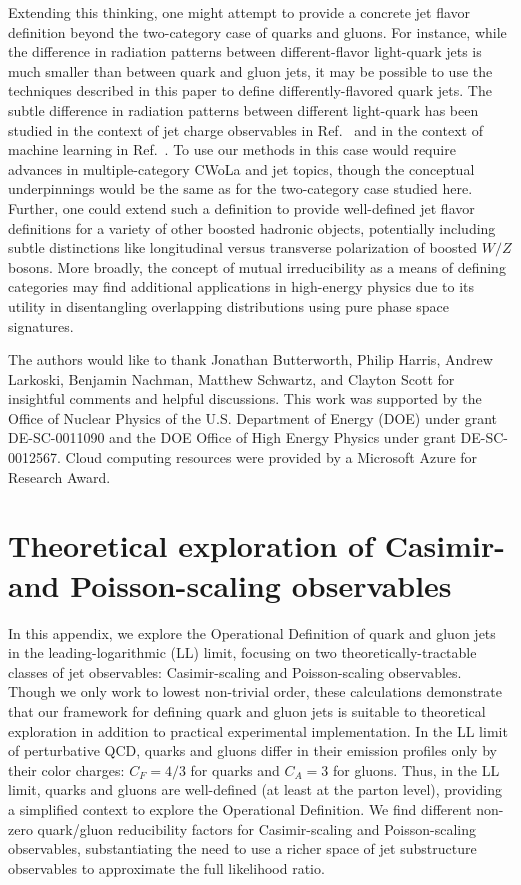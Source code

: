 \documentclass[letterpaper,11pt]{article}
\DeclareRobustCommand{\Ref}[1]{Ref.~\cite{#1}}
\begin{document}
Extending this thinking, one might attempt to provide a concrete jet flavor definition beyond the two-category case of quarks and gluons.
%
For instance, while the difference in radiation patterns between different-flavor light-quark jets is much smaller than between quark and gluon jets, it may be possible to use the techniques described in this paper to define differently-flavored quark jets.
%
The subtle difference in radiation patterns between different light-quark has been studied in the context of jet charge observables in \Ref{Krohn:2012fg} and in the context of machine learning in \Ref{Fraser:2018ieu}.
%
To use our methods in this case would require advances in multiple-category CWoLa and jet topics, though the conceptual underpinnings would be the same as for the two-category case studied here.
%
Further, one could extend such a definition to provide well-defined jet flavor definitions for a variety of other boosted hadronic objects, potentially including subtle distinctions like longitudinal versus transverse polarization of boosted $W/Z$ bosons.
%
More broadly, the concept of mutual irreducibility as a means of defining categories may find additional applications in high-energy physics due to its utility in disentangling overlapping distributions using pure phase space signatures.


\acknowledgments 
The authors would like to thank Jonathan Butterworth, Philip Harris, Andrew Larkoski, Benjamin Nachman, Matthew Schwartz, and Clayton Scott for insightful comments and helpful discussions.
%
This work was supported by the Office of Nuclear Physics of the U.S. Department of Energy (DOE) under grant DE-SC-0011090 and the DOE Office of High Energy Physics under grant DE-SC-0012567.
%
Cloud computing resources were provided by a Microsoft Azure for Research Award.


\appendix


\section{Theoretical exploration of Casimir- and Poisson-scaling observables}
\label{sec:explore}


In this appendix, we explore the Operational Definition of quark and gluon jets in the leading-logarithmic (LL) limit, focusing on two theoretically-tractable classes of jet observables: Casimir-scaling and Poisson-scaling observables.
%
Though we only work to lowest non-trivial order, these calculations demonstrate that our framework for defining quark and gluon jets is suitable to theoretical exploration in addition to practical experimental implementation.
%
In the LL limit of perturbative QCD, quarks and gluons differ in their emission profiles only by their color charges: $C_F=4/3$ for quarks and $C_A=3$ for gluons.
%
Thus, in the LL limit, quarks and gluons are well-defined (at least at the parton level), providing a simplified context to explore the Operational Definition.
%
We find different non-zero quark/gluon reducibility factors for Casimir-scaling and Poisson-scaling observables, substantiating the need to use a richer space of jet substructure observables to approximate the full likelihood ratio.
\end{document}

